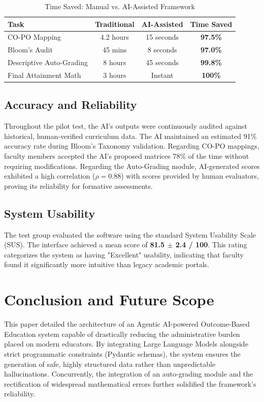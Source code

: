 \documentclass[conference]{IEEEtran}
\begin{document}
\begin{table}[htbp]
\caption{Time Saved: Manual vs. AI-Assisted Framework}
\label{tab:time}
\centering
\begin{tabular}{lccc}
\toprule
\textbf{Task} & \textbf{Traditional} & \textbf{AI-Assisted} & \textbf{Time Saved} \\
\midrule
CO-PO Mapping & 4.2 hours & 15 seconds & \textbf{97.5\%} \\
Bloom's Audit & 45 mins & 8 seconds & \textbf{97.0\%} \\
Descriptive Auto-Grading & 8 hours & 45 seconds & \textbf{99.8\%} \\
Final Attainment Math & 3 hours & Instant & \textbf{100\%} \\
\bottomrule
\end{tabular}
\end{table}

\subsection{Accuracy and Reliability}
Throughout the pilot test, the AI's outputs were continuously audited against historical, human-verified curriculum data. The AI maintained an estimated 91\% accuracy rate during Bloom's Taxonomy validation. Regarding CO-PO mappings, faculty members accepted the AI's proposed matrices 78\% of the time without requiring modifications. Regarding the Auto-Grading module, AI-generated scores exhibited a high correlation ($\rho = 0.88$) with scores provided by human evaluators, proving its reliability for formative assessments.

\subsection{System Usability}
The test group evaluated the software using the standard System Usability Scale (SUS). The interface achieved a mean score of \textbf{81.5 $\pm$ 2.4 / 100}. This rating categorizes the system as having "Excellent" usability, indicating that faculty found it significantly more intuitive than legacy academic portals.

\section{Conclusion and Future Scope}

This paper detailed the architecture of an Agentic AI-powered Outcome-Based Education system capable of drastically reducing the administrative burden placed on modern educators. By integrating Large Language Models alongside strict programmatic constraints (Pydantic schemas), the system ensures the generation of safe, highly structured data rather than unpredictable hallucinations. Concurrently, the integration of an auto-grading module and the rectification of widespread mathematical errors further solidified the framework's reliability.
\end{document}
